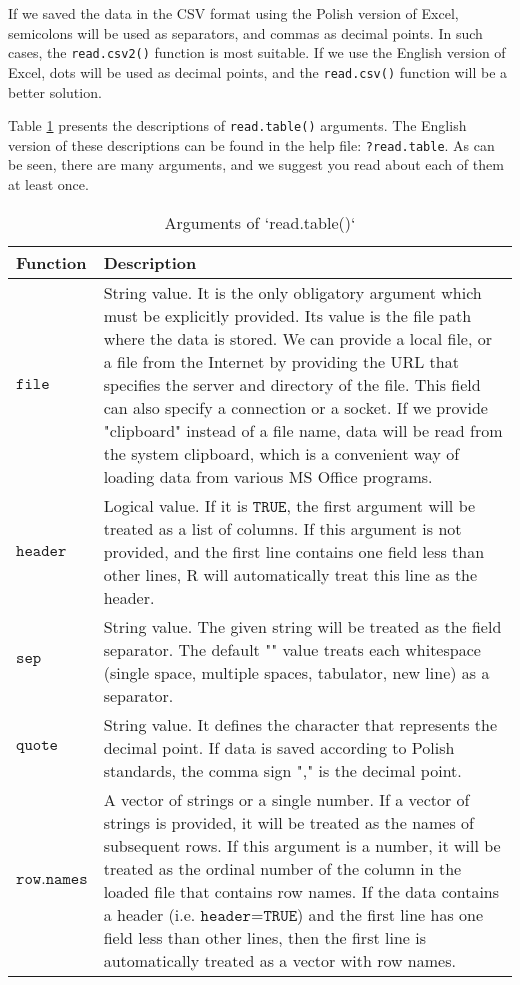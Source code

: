 \documentclass[]{book}
\theoremstyle{definition}
\theoremstyle{definition}
\theoremstyle{definition}
\theoremstyle{remark}
\begin{document}
If we saved the data in the CSV format using the Polish version of
Excel, semicolons will be used as separators, and commas as decimal
points. In such cases, the \texttt{read.csv2()} function is most
suitable. If we use the English version of Excel, dots will be used as
decimal points, and the \texttt{read.csv()} function will be a better
solution.

Table \ref{tab:tab02} presents the descriptions of \texttt{read.table()}
arguments. The English version of these descriptions can be found in the
help file: \texttt{?read.table}. As can be seen, there are many
arguments, and we suggest you read about each of them at least once.

\begin{table}

\caption{\label{tab:tab02}Arguments of `read.table()`}
\centering
\begin{tabular}[t]{>{}l||>{\raggedright\arraybackslash}p{35em}}
\hline
Function & Description\\
\hline
$\texttt{file}$ & String value. It is the only obligatory argument which must be explicitly provided. Its value is the file path where the data is stored. We can provide a local file, or a file from the Internet by providing the URL that specifies the server and directory of the file. This field can also specify a connection or a socket. If we provide "clipboard" instead of a file name, data will be read from the system clipboard, which is a convenient way of loading data from various MS Office programs.\\
\hline
$\texttt{header}$ & Logical value. If it is $\texttt{TRUE}$,  the first argument will be treated as a list of columns. If this argument is not provided, and the first line contains one field less than other lines, R will automatically treat this line as the header.\\
\hline
$\texttt{sep}$ & String value. The given string will be treated as the field separator. The default "" value treats each whitespace (single space, multiple spaces, tabulator, new line) as a separator.\\
\hline
$\texttt{quote}$ & String value. It defines the character that represents the decimal point. If data is saved according to Polish standards, the comma sign "," is the decimal point.\\
\hline
$\texttt{row.names}$ & A vector of strings or a single number. If a vector of strings is provided, it will be treated as the names of subsequent rows. If this argument is a number, it will be treated as the ordinal number of the column in the loaded file that contains row names. If the data contains a header (i.e. $\texttt{header=TRUE}$) and the first line has one field less than other lines, then the first line is automatically treated as a vector with row names.\\

\end{tabular}
\end{table}
\end{document}
